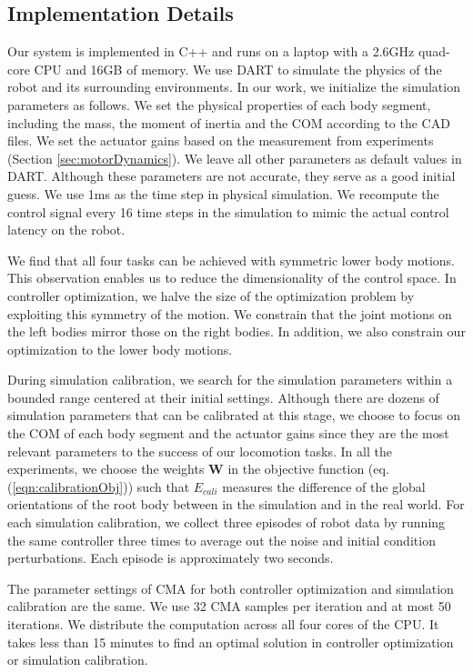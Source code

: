 \subsection{Implementation Details}

Our system is implemented in C++ and runs on a laptop with a 2.6GHz quad-core CPU and 16GB of memory. We use DART to simulate the physics of the robot and its surrounding environments. In our work, we initialize the simulation parameters as follows. We set the physical properties of each body segment, including the mass, the moment of inertia and the COM according to the CAD files. We set the actuator gains based on the measurement from experiments (Section \ref{sec:motorDynamics}). We leave all other parameters as default values in DART. Although these parameters are not accurate, they serve as a good initial guess. We use 1ms as the time step in physical simulation. We recompute the control signal every 16 time steps in the simulation to mimic the actual control latency on the robot.

We find that all four tasks can be achieved with symmetric lower body motions. This observation enables us to reduce the dimensionality of the control space. In controller optimization, we halve the size of the optimization problem by exploiting this symmetry of the motion. We constrain that the joint motions on the left bodies mirror those on the right bodies. In addition, we also constrain our optimization to the lower body motions.

During simulation calibration, we search for the simulation parameters within a bounded range centered at their initial settings. Although there are dozens of simulation parameters that can be calibrated at this stage, we choose to focus on the COM of each body segment and the actuator gains since they are the most relevant parameters to the success of our locomotion tasks. In all the experiments, we choose the weights $\mathbf{W}$ in the objective function (eq. (\ref{eqn:calibrationObj})) such that $E_{cali}$ measures the difference of the global orientations of the root body between in the simulation and in the real world. For each simulation calibration, we collect three episodes of robot data by running the same controller three times to average out the noise and initial condition perturbations. Each episode is approximately two seconds.

The parameter settings of CMA for both controller optimization and simulation calibration are the same. We use 32 CMA samples per iteration and at most 50 iterations. We distribute the computation across all four cores of the CPU. It takes less than 15 minutes to find an optimal solution in controller optimization or simulation calibration.

